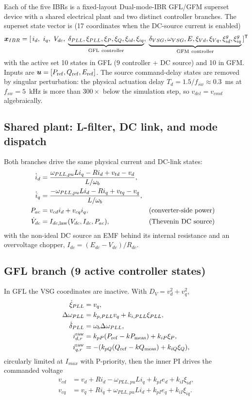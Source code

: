 \documentclass[12pt,a4paper]{article}
\newcommand{\vect}[1]{\boldsymbol{#1}}
\begin{document}
Each of the five IBRs is a fixed-layout Dual-mode-IBR GFL/GFM superset device with a
shared electrical plant and two distinct controller branches.  The superset
state vector is (17 coordinates when the DC-source current is enabled)
\[
\vect x_{IBR}=[\,i_d,\ i_q,\ V_{dc},\;
\underbrace{\delta_{PLL},\xi_{PLL},\xi_P,\xi_Q,\xi_{id},\xi_{iq}}_{\rm GFL\ controller},\;
\underbrace{\delta_{VSG},\omega_{VSG},E,\xi_{Vd},\xi_{Vq},\xi_{id}^{g},\xi_{iq}^{g}}_{\rm GFM\ controller}\,]^{\mathsf T}
\]
with the active set 10 states in GFL (9 controller + DC source) and 10 in GFM.
Inputs are $\vect u=[P_{\rm ref},Q_{\rm ref},E_{\rm ref}]$.  The source command-delay
states are removed by singular perturbation: the physical actuation delay
$T_d=1.5/f_{sw}\approx0.3$~ms at $f_{sw}=5$~kHz is more than $300\times$ below
the simulation step, so $v_{del}=v_{cmd}$ algebraically.

\subsection{Shared plant: L-filter, DC link, and mode dispatch}

Both branches drive the same physical current and DC-link states:
\begin{align}
\dot i_d&=\frac{\omega_{PLL,pu}L i_q-R i_d+v_{td}-v_d}{L/\omega_b},\\
\dot i_q&=\frac{-\omega_{PLL,pu}L i_d-R i_q+v_{tq}-v_q}{L/\omega_b},\\
P_{ac}&=v_{cd}i_d+v_{cq}i_q,&& \text{(converter-side power)}\\
\dot V_{dc}&=I_{dc,\rm law}(V_{dc},I_{dc},P_{ac}),&& \text{(Thevenin DC source)}
\end{align}
with the non-ideal DC source an EMF behind its internal resistance and an
overvoltage chopper, $I_{dc}=(E_{dc}-V_{dc})/R_{dc}$.

\subsection{GFL branch (9 active controller states)}

In GFL the VSG coordinates are inactive.  With $D_V=v_d^2+v_q^2$,
\begin{align}
\dot\xi_{PLL}&=v_q,\\
\Delta\omega_{PLL}&=k_{p,PLL}v_q+k_{i,PLL}\xi_{PLL},\\
\dot\delta_{PLL}&=\omega_b\Delta\omega_{PLL},\\
i_{d,r}^{\rm raw}&=k_{pP}(P_{\rm ref}-k P_{\rm meas})+k_{iP}\xi_P,\\
i_{q,r}^{\rm raw}&=-(k_{pQ}(Q_{\rm ref}-k Q_{\rm meas})+k_{iQ}\xi_Q),
\end{align}
circularly limited at $I_{max}$ with P-priority, then the inner PI drives the
commanded voltage
\begin{align}
v_{cd}&=v_d+R i_d-\omega_{PLL,pu}L i_q+k_{pI}e_d+k_{iI}\xi_{id},\\
v_{cq}&=v_q+R i_q+\omega_{PLL,pu}L i_d+k_{pI}e_q+k_{iI}\xi_{iq}.
\end{align}
\end{document}
